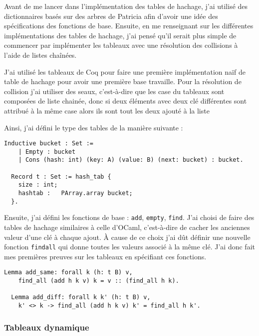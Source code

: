 \documentclass{article}
\begin{document}
  Avant de me lancer dans l'implémentation des tables de hachage, j'ai
utilisé des dictionnaires basés sur des arbres de Patricia afin d'avoir une idée
des spécifications des fonctions de base. Ensuite, en me renseignant sur les
différentes implémentations des tables de hachage, j'ai pensé qu'il serait
plus simple de commencer par implémenter les tableaux avec une résolution des
collisions à l'aide de listes chaînées.

  J'ai utilisé les tableaux de Coq pour faire une première implémentation naïf
de table de hachage pour avoir une première base travaille. Pour la résolution
de collision j'ai utiliser des seaux, c'est-à-dire que les case du tableaux sont
composées de liste chainée, donc si deux éléments avec deux clé différentes sont
attribué à la même case alors ils sont tout les deux ajouté à la liste

Ainsi, j'ai défini le type des tables de la manière suivante :

\begin{lstlisting}[language=Coq]
  Inductive bucket : Set :=
    | Empty : bucket
    | Cons (hash: int) (key: A) (value: B) (next: bucket) : bucket.

  Record t : Set := hash_tab {
    size : int;
    hashtab :   PArray.array bucket;
  }.
\end{lstlisting}

  Ensuite, j'ai défini les fonctions de base : \texttt{add}, \texttt{empty},
\texttt{find}. J'ai choisi de faire des tables de hachage similaires à celle
d'OCaml, c'est-à-dire de cacher les anciennes valeur d'une clé à chaque ajout.
\`A cause de ce choix j'ai dût définir une nouvelle fonction \texttt{findall} qui
donne toutes les valeurs associé à la même clé. J'ai donc fait mes premières
preuves sur les tableaux en spécifiant ces fonctions.

\begin{lstlisting}[language=Coq]
  Lemma add_same: forall k (h: t B) v,
    find_all (add h k v) k = v :: (find_all h k).

  Lemma add_diff: forall k k' (h: t B) v,
    k' <> k -> find_all (add h k v) k' = find_all h k'.
\end{lstlisting}

  \subsubsection{Tableaux dynamique}
\end{document}
